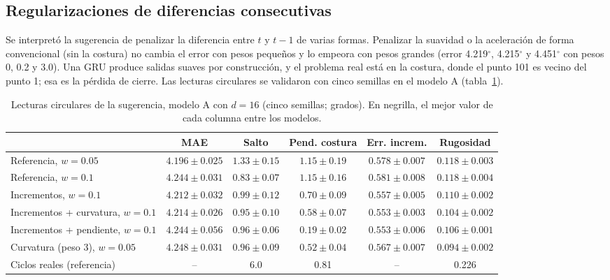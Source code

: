 \documentclass[11pt,a4paper]{amsart}
\newcommand{\gr}{$^{\circ}$}
\begin{document}
\subsection{Regularizaciones de diferencias consecutivas}

Se interpretó la sugerencia de penalizar la diferencia entre $t$ y $t-1$ de varias formas. Penalizar la suavidad o la aceleración de forma convencional (sin la costura) no cambia el error con pesos pequeños y lo empeora con pesos grandes (error 4.219\gr{}, 4.215\gr{} y 4.451\gr{} con pesos 0, 0.2 y 3.0). Una GRU produce salidas suaves por construcción, y el problema real está en la costura, donde el punto 101 es vecino del punto 1; esa es la pérdida de cierre. Las lecturas circulares se validaron con cinco semillas en el modelo A (tabla~\ref{tab:lecturas}).

\begin{table}[h]
\centering\footnotesize
\setlength{\tabcolsep}{3pt}
\begin{tabular}{lccccc}
\toprule
 & MAE & Salto & Pend. costura & Err. increm. & Rugosidad \\
\midrule
Referencia, $w=0.05$ & $\mathbf{4.196}\pm0.025$ & $1.33\pm0.15$ & $1.15\pm0.19$ & $0.578\pm0.007$ & $0.118\pm0.003$ \\
Referencia, $w=0.1$ & $4.244\pm0.031$ & $\mathbf{0.83}\pm0.07$ & $1.15\pm0.16$ & $0.581\pm0.008$ & $0.118\pm0.004$ \\
Incrementos, $w=0.1$ & $4.212\pm0.032$ & $0.99\pm0.12$ & $0.70\pm0.09$ & $0.557\pm0.005$ & $0.110\pm0.002$ \\
Incrementos + curvatura, $w=0.1$ & $4.214\pm0.026$ & $0.95\pm0.10$ & $0.58\pm0.07$ & $\mathbf{0.553}\pm0.003$ & $0.104\pm0.002$ \\
Incrementos + pendiente, $w=0.1$ & $4.244\pm0.056$ & $0.96\pm0.06$ & $\mathbf{0.19}\pm0.02$ & $\mathbf{0.553}\pm0.006$ & $0.106\pm0.001$ \\
Curvatura (peso 3), $w=0.05$ & $4.248\pm0.031$ & $0.96\pm0.09$ & $0.52\pm0.04$ & $0.567\pm0.007$ & $\mathbf{0.094}\pm0.002$ \\
\midrule
Ciclos reales (referencia) & -- & 6.0 & 0.81 & -- & 0.226 \\
\bottomrule
\end{tabular}
\caption{Lecturas circulares de la sugerencia, modelo A con $d=16$ (cinco semillas; grados). En negrilla, el mejor valor de cada columna entre los modelos.}
\label{tab:lecturas}
\end{table}
\end{document}
